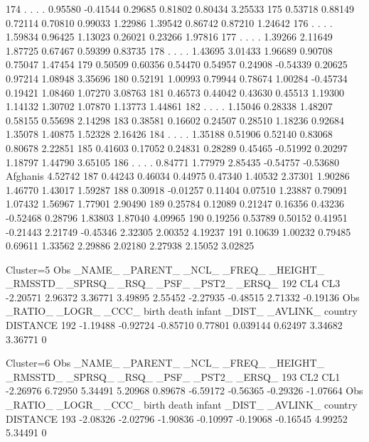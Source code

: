 \documentclass{article}
\begin{document}
\begin{Woutput}
174  .        .       .       .       0.95580 -0.41544  0.29685  0.81802  0.80434           3.25533
175 0.53718  0.88149 0.72114 0.70810  0.99033  1.22986  1.39542  0.86742  0.87210           1.24642
176  .        .       .       .       1.59834  0.96425  1.13023  0.26021  0.23266           1.97816
177  .        .       .       .       1.39266  2.11649  1.87725  0.67467  0.59399           0.83735
178  .        .       .       .       1.43695  3.01433  1.96689  0.90708  0.75047           1.47454
179 0.50509  0.60356 0.54470 0.54957  0.24908 -0.54339  0.20625  0.97214  1.08948           3.35696
180 0.52191  1.00993 0.79944 0.78674  1.00284 -0.45734  0.19421  1.08460  1.07270           3.08763
181 0.46573  0.44042 0.43630 0.45513  1.19300  1.14132  1.30702  1.07870  1.13773           1.44861
182  .        .       .       .       1.15046  0.28338  1.48207  0.58155  0.55698           2.14298
183 0.38581  0.16602 0.24507 0.28510  1.18236  0.92684  1.35078  1.40875  1.52328           2.16426
184  .        .       .       .       1.35188  0.51906  0.52140  0.83068  0.80678           2.22851
185 0.41603  0.17052 0.24831 0.28289  0.45465 -0.51992  0.20297  1.18797  1.44790           3.65105
186  .        .       .       .       0.84771  1.77979  2.85435 -0.54757 -0.53680 Afghanis  4.52742
187 0.44243  0.46034 0.44975 0.47340  1.40532  2.37301  1.90286  1.46770  1.43017           1.59287
188 0.30918 -0.01257 0.11404 0.07510  1.23887  0.79091  1.07432  1.56967  1.77901           2.90490
189 0.25784  0.12089 0.21247 0.16356  0.43236 -0.52468  0.28796  1.83803  1.87040           4.09965
190 0.19256  0.53789 0.50152 0.41951 -0.21443  2.21749 -0.45346  2.32305  2.00352           4.19237
191 0.10639  1.00232 0.79485 0.69611  1.33562  2.29886  2.02180  2.27938  2.15052           3.02825

Cluster=5
Obs _NAME_ _PARENT_   _NCL_   _FREQ_ _HEIGHT_ _RMSSTD_ _SPRSQ_   _RSQ_    _PSF_   _PST2_  _ERSQ_
192  CL4     CL3    -2.20571 2.96372  3.36771  3.49895 2.55452 -2.27935 -0.48515 2.71332 -0.19136
Obs  _RATIO_   _LOGR_     _CCC_    birth     death    infant   _DIST_  _AVLINK_  country  DISTANCE
192 -1.19488  -0.92724  -0.85710  0.77801  0.039144  0.62497  3.34682   3.36771               0

Cluster=6
Obs _NAME_ _PARENT_   _NCL_   _FREQ_ _HEIGHT_ _RMSSTD_ _SPRSQ_   _RSQ_    _PSF_   _PST2_   _ERSQ_
193  CL2     CL1    -2.26976 6.72950  5.34491  5.20968 0.89678 -6.59172 -0.56365 -0.29326 -1.07664
Obs  _RATIO_  _LOGR_    _CCC_    birth    death   infant   _DIST_ _AVLINK_ country DISTANCE
193 -2.08326 -2.02796 -1.90836 -0.10997 -0.19068 -0.16545 4.99252  5.34491             0
\end{Woutput}
\end{document}
